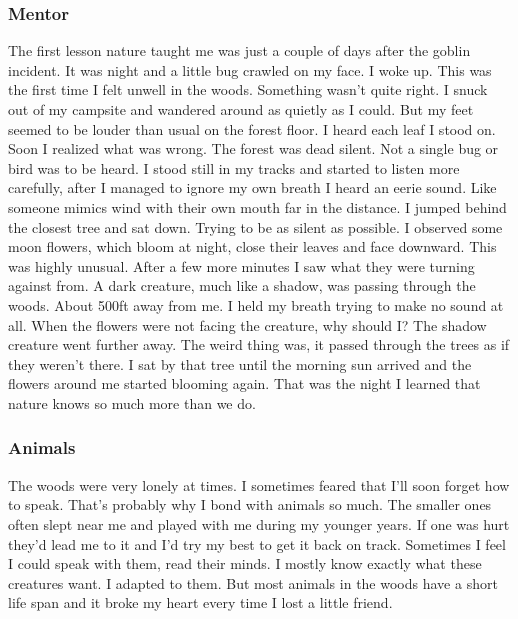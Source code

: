 \documentclass[letterpaper,10pt,twoside,twocolumn,openany]{book}
\begin{document}
	\subsubsection{Mentor}
	The first lesson nature taught me was just a couple of days after the goblin incident. It was night and a little bug crawled on my face. I woke up. This was the first time I felt unwell in the woods. Something wasn’t quite right. I snuck out of my campsite and wandered around as quietly as I could. But my feet seemed to be louder than usual on the forest floor. I heard each leaf I stood on. Soon I realized what was wrong. The forest was dead silent. Not a single bug or bird was to be heard. I stood still in my tracks and started to listen more carefully, after I managed to ignore my own breath I heard an eerie sound. Like someone mimics wind with their own mouth far in the distance. I jumped behind the closest tree and sat down. Trying to be as silent as possible. I observed some moon flowers, which bloom at night, close their leaves and face downward. This was highly unusual. After a few more minutes I saw what they were turning against from. A dark creature, much like a shadow, was passing through the woods. About 500ft away from me. I held my breath trying to make no sound at all. When the flowers were not facing the creature, why should I? The shadow creature went further away. The weird thing was, it passed through the trees as if they weren’t there. I sat by that tree until the morning sun arrived and the flowers around me started blooming again. That was the night I learned that nature knows so much more than we do. 
	
	\subsubsection{Animals}
	The woods were very lonely at times. I sometimes feared that I'll soon forget how to speak. That's probably why I bond with animals so much. The smaller ones often slept near me and played with me during my younger years. If one was hurt they'd lead me to it and I'd try my best to get it back on track. Sometimes I feel I could speak with them, read their minds. I mostly know exactly what these creatures want. I adapted to them. But most animals in the woods have a short life span and it broke my heart every time I lost a little friend. 
	
\end{document}
